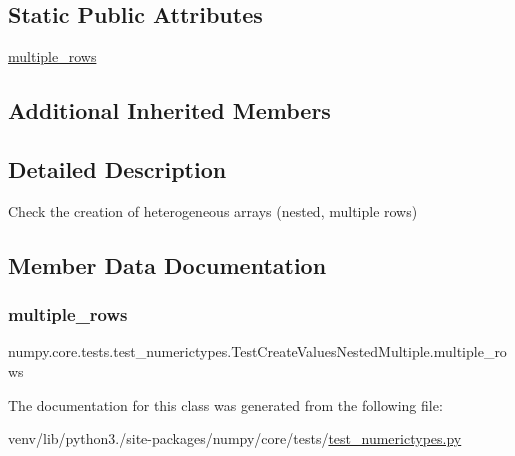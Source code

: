 \subsection*{Static Public Attributes}
\begin{DoxyCompactItemize}
\item 
\hyperlink{classnumpy_1_1core_1_1tests_1_1test__numerictypes_1_1TestCreateValuesNestedMultiple_a2b3df8fe1e673402fe71011c6b876786}{multiple\+\_\+rows}
\end{DoxyCompactItemize}
\subsection*{Additional Inherited Members}


\subsection{Detailed Description}
\begin{DoxyVerb}Check the creation of heterogeneous arrays (nested, multiple rows)\end{DoxyVerb}
 

\subsection{Member Data Documentation}
\mbox{\label{classnumpy_1_1core_1_1tests_1_1test__numerictypes_1_1TestCreateValuesNestedMultiple_a2b3df8fe1e673402fe71011c6b876786}} 
\subsubsection{\texorpdfstring{multiple\+\_\+rows}{multiple\_rows}}
{\footnotesize\ttfamily numpy.\+core.\+tests.\+test\+\_\+numerictypes.\+Test\+Create\+Values\+Nested\+Multiple.\+multiple\+\_\+rows\hspace{0.3cm}{\ttfamily [static]}}



The documentation for this class was generated from the following file\+:\begin{DoxyCompactItemize}
\item 
venv/lib/python3./site-\/packages/numpy/core/tests/\hyperlink{test__numerictypes_8py}{test\+\_\+numerictypes.\+py}\end{DoxyCompactItemize}
